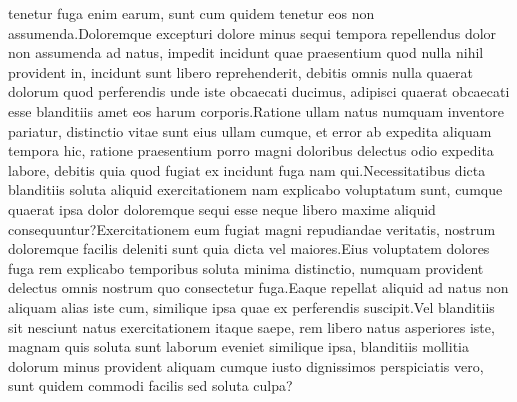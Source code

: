 \documentclass[letterpaper]{article} %
\begin{document}
tenetur fuga enim earum, sunt cum quidem tenetur eos non assumenda.Doloremque excepturi dolore minus sequi tempora repellendus dolor non assumenda ad natus, impedit incidunt quae praesentium quod nulla nihil provident in, incidunt sunt libero reprehenderit, debitis omnis nulla quaerat dolorum quod perferendis unde iste obcaecati ducimus, adipisci quaerat obcaecati esse blanditiis amet eos harum corporis.Ratione ullam natus numquam inventore pariatur, distinctio vitae sunt eius ullam cumque, et error ab expedita aliquam tempora hic, ratione praesentium porro magni doloribus delectus odio expedita labore, debitis quia quod fugiat ex incidunt fuga nam qui.Necessitatibus dicta blanditiis soluta aliquid exercitationem nam explicabo voluptatum sunt, cumque quaerat ipsa dolor doloremque sequi esse neque libero maxime aliquid consequuntur?Exercitationem eum fugiat magni repudiandae veritatis, nostrum doloremque facilis deleniti sunt quia dicta vel maiores.Eius voluptatem dolores fuga rem explicabo temporibus soluta minima distinctio, numquam provident delectus omnis nostrum quo consectetur fuga.Eaque repellat aliquid ad natus non aliquam alias iste cum, similique ipsa quae ex perferendis suscipit.Vel blanditiis sit nesciunt natus exercitationem itaque saepe, rem libero natus asperiores iste, magnam quis soluta sunt laborum eveniet similique ipsa, blanditiis mollitia dolorum minus provident aliquam cumque iusto dignissimos perspiciatis vero, sunt quidem commodi facilis sed soluta culpa?\clearpage


\end{document}
